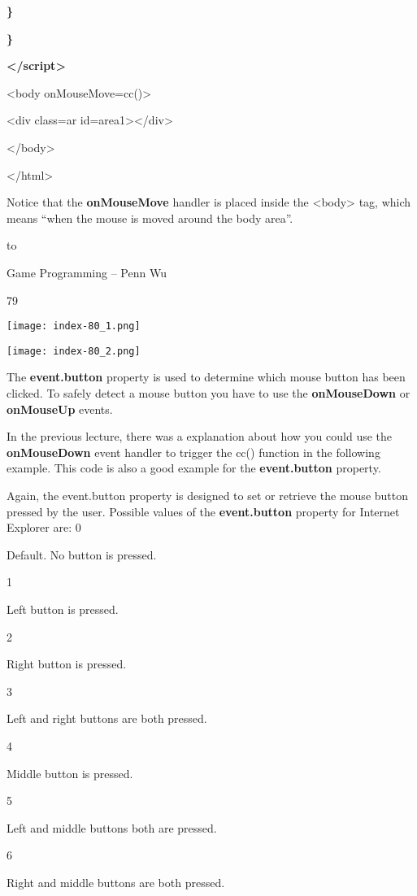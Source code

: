\documentclass[
]{article}
\begin{document}
\textbf{\}}

\textbf{\}}

\textbf{\textless/script\textgreater{}}

\textbf{}

\textless body onMouseMove=cc()\textgreater{}

\textless div class=ar id=area1\textgreater\textless/div\textgreater{}

\textless/body\textgreater{}

\textless/html\textgreater{}

Notice that the \textbf{onMouseMove} handler is placed inside the
\textless body\textgreater{} tag, which means ``when the mouse is moved
around the body area''.

to

Game Programming -- Penn Wu

79

\protect\hypertarget{index_split_006.htmlux5cux23p80}{}{}\texttt{[image: index-80\_1.png]}

\texttt{[image: index-80\_2.png]}

The \textbf{event.button} property is used to determine which mouse
button has been clicked. To safely detect a mouse button you have to use
the \textbf{onMouseDown} or \textbf{onMouseUp} events.

In the previous lecture, there was a explanation about how you could use
the \textbf{onMouseDown} event handler to trigger the cc() function in
the following example. This code is also a good example for the
\textbf{event.button} property.

Again, the event.button property is designed to set or retrieve the
mouse button pressed by the user. Possible values of the
\textbf{event.button} property for Internet Explorer are: 0

Default. No button is pressed.

1

Left button is pressed.

2

Right button is pressed.

3

Left and right buttons are both pressed.

4

Middle button is pressed.

5

Left and middle buttons both are pressed.

6

Right and middle buttons are both pressed.
\end{document}
